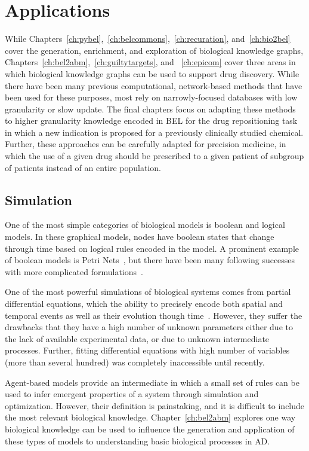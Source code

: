 \section{Applications}
\label{sec:introduction_applications}

While Chapters~\ref{ch:pybel},~\ref{ch:belcommons},~\ref{ch:recuration}, and~\ref{ch:bio2bel} cover the generation, enrichment, and exploration of biological knowledge graphs, Chapters~\ref{ch:bel2abm},~\ref{ch:guiltytargets}, and ~\ref{ch:epicom} cover three areas in which biological knowledge graphs can be used to support drug discovery.
While there have been many previous computational, network-based methods that have been used for these purposes, most rely on narrowly-focused databases with low granularity or slow update.
The final chapters focus on adapting these methods to higher granularity knowledge encoded in BEL for the drug repositioning task in which a new indication is proposed for a previously clinically studied chemical.
Further, these approaches can be carefully adapted for precision medicine, in which the use of a given drug should be prescribed to a given patient of subgroup of patients instead of an entire population.

\subsection{Simulation}

One of the most simple categories of biological models is boolean and logical models.
In these graphical models, nodes have boolean states that change through time based on logical rules encoded in the model.
A prominent example of boolean models is Petri Nets~\cite{Peterson1977}, but there have been many following successes with more complicated formulations~\cite{Saez-Rodriguez2011,Gyori2017,Karlebach2008}.

One of the most powerful simulations of biological systems comes from partial differential equations, which the ability to precisely encode both spatial and temporal events as well as their evolution though time~\cite{Lopez2013}.
However, they suffer the drawbacks that they have a high number of unknown parameters either due to the lack of available experimental data, or due to unknown intermediate processes.
Further, fitting differential equations with high number of variables (more than several hundred) was completely inaccessible until recently.

Agent-based models provide an intermediate in which a small set of rules can be used to infer emergent properties of a system through simulation and optimization.
However, their definition is painstaking, and it is difficult to include the most relevant biological knowledge.
Chapter~\ref{ch:bel2abm} explores one way biological knowledge can be used to influence the generation and application of these types of models to understanding basic biological processes in \ac{AD}.

